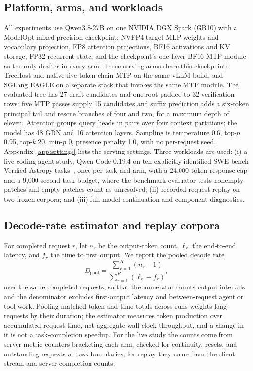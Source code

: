 \documentclass[sigconf,anonymous,review]{acmart}
\newcommand{\sys}{TreeHost}
\begin{document}
\subsection{Platform, arms, and workloads}
All experiments use Qwen3.8-27B on one NVIDIA DGX Spark (GB10) with a ModelOpt mixed-precision checkpoint: NVFP4 target MLP weights and vocabulary projection, FP8 attention projections, BF16 activations and KV storage, FP32 recurrent state, and the checkpoint's one-layer BF16 MTP module as the only drafter in every arm. Three serving arms share this checkpoint: \sys{} and native five-token chain MTP on the same vLLM build, and SGLang EAGLE on a separate stack that invokes the same MTP module. The evaluated tree has 27 draft candidates and one root padded to 32 verification rows: five MTP passes supply 15 candidates and suffix prediction adds a six-token principal tail and rescue branches of four and two, for a maximum depth of eleven. Attention groups query heads in pairs over four context partitions; the model has 48 GDN and 16 attention layers. Sampling is temperature 0.6, top-$p$ 0.95, top-$k$ 20, min-$p$ 0, presence penalty 1.0, with no per-request seed. Appendix~\ref{app:settings} lists the serving settings. Three workloads are used: (i) a live coding-agent study, Qwen Code 0.19.4 on ten explicitly identified SWE-bench Verified Astropy tasks~\cite{jimenez2024swe}, once per task and arm, with a 24,000-token response cap and a 9,000-second task budget, where the benchmark evaluator tests nonempty patches and empty patches count as unresolved; (ii) recorded-request replay on two frozen corpora; and (iii) full-model continuation and component diagnostics.

\subsection{Decode-rate estimator and replay corpora}
\label{sec:method-rate}
For completed request $r$, let $n_r$ be the output-token count, $\ell_r$ the end-to-end latency, and $f_r$ the time to first output. We report the pooled decode rate
\begin{equation}
 D_{\mathrm{pool}} = \frac{\sum_{r=1}^{R}(n_r-1)}{\sum_{r=1}^{R}(\ell_r-f_r)},
 \label{eq:pooled-decode}
\end{equation}
over the same completed requests, so that the numerator counts output intervals and the denominator excludes first-output latency and between-request agent or tool work. Pooling matched token and time totals across runs weights long requests by their duration; the estimator measures token production over accumulated request time, not aggregate wall-clock throughput, and a change in it is not a task-completion speedup. For the live study the counts come from server metric counters bracketing each arm, checked for continuity, resets, and outstanding requests at task boundaries; for replay they come from the client stream and server completion counts.
\end{document}
